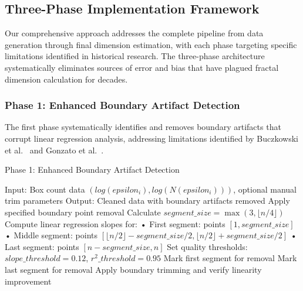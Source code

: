 \documentclass[preprint,12pt]{elsarticle}
\def\textbf#1{#1}%
\def\epsilon{epsilon}%
\begin{document}
\subsection{Three-Phase Implementation Framework}

Our comprehensive approach addresses the complete pipeline from data generation through final dimension estimation, with each phase targeting specific limitations identified in historical research. The three-phase architecture systematically eliminates sources of error and bias that have plagued fractal dimension calculation for decades.

\subsubsection{Phase 1: Enhanced Boundary Artifact Detection}

The first phase systematically identifies and removes boundary artifacts that corrupt linear regression analysis, addressing limitations identified by Buczkowski et al.~\cite{buczkowski1998} and Gonzato et al.~\cite{gonzato1998}.

\begin{algorithm}[!htbp]
\caption{Phase 1: Enhanced Boundary Artifact Detection}
\begin{algorithmic}[1]
\State \textbf{Input:} Box count data $(log(\epsilon_i), log(N(\epsilon_i)))$, optional manual trim parameters
\State \textbf{Output:} Cleaned data with boundary artifacts removed
\State
{}
    \State Apply specified boundary point removal
\EndIf
\State
{}
    \State Calculate $segment\_size = \max(3, \lfloor n/4 \rfloor)$
    \State Compute linear regression slopes for:
    \State \hspace{1em} • First segment: points $[1, segment\_size]$
    \State \hspace{1em} • Middle segment: points $[\lfloor n/2 \rfloor - segment\_size/2, \lfloor n/2 \rfloor + segment\_size/2]$
    \State \hspace{1em} • Last segment: points $[n - segment\_size, n]$
    \State
    \State Set quality thresholds: $slope\_threshold = 0.12$, $r^2\_threshold = 0.95$
    \State
        \State Mark first segment for removal
    \EndIf
        \State Mark last segment for removal
    \EndIf
    \State
    \State Apply boundary trimming and verify linearity improvement
\EndIf
\end{algorithmic}
\end{algorithm}
\end{document}
